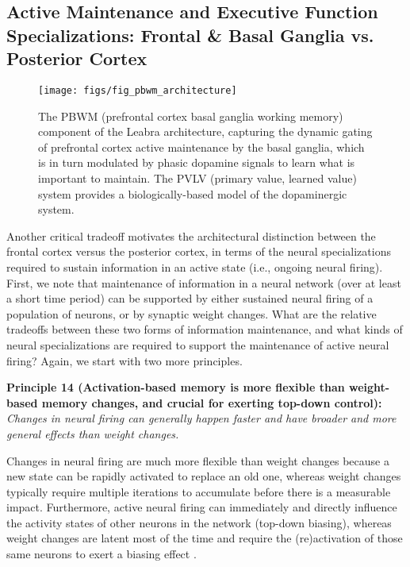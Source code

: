 \documentclass[11pt,twoside]{article}
\begin{document}
\subsection{Active Maintenance and Executive Function Specializations: Frontal
  \& Basal Ganglia vs. Posterior Cortex}

\begin{figure}
  \centering\texttt{[image: figs/fig\_pbwm\_architecture]}
  \caption{\small The PBWM (prefrontal cortex basal ganglia working
    memory) component of the Leabra architecture, capturing the dynamic gating
    of prefrontal cortex active maintenance by the basal ganglia, which is in
    turn modulated by phasic dopamine signals to learn what is important to
    maintain.  The PVLV (primary value, learned value) system provides a
    biologically-based model of the dopaminergic system. }
  \label{fig.pbwm_architecture}
\end{figure}

Another critical tradeoff motivates the architectural distinction between the
frontal cortex versus the posterior cortex, in terms of the neural
specializations required to sustain information in an active state (i.e.,
ongoing neural firing).  First, we note that maintenance of information in a
neural network (over at least a short time period) can be supported by either
sustained neural firing of a population of neurons, or by synaptic weight
changes.  What are the relative tradeoffs between these two forms of
information maintenance, and what kinds of neural specializations are required
to support the maintenance of active neural firing?  Again, we start with two
more principles.

{\bf Principle 14 (Activation-based memory is more flexible than weight-based
  memory changes, and crucial for exerting top-down control):} {\em Changes in
  neural firing can generally happen faster and have broader and more general
  effects than weight changes.}

Changes in neural firing are much more flexible than weight changes because a
new state can be rapidly activated to replace an old one, whereas weight
changes typically require multiple iterations to accumulate before there is a
measurable impact.  Furthermore, active neural firing can immediately and
directly influence the activity states of other neurons in the network
(top-down biasing), whereas weight changes are latent most of the time and
require the (re)activation of those same neurons to exert a biasing effect
\cite{MortonMunakata02}.
\end{document}
